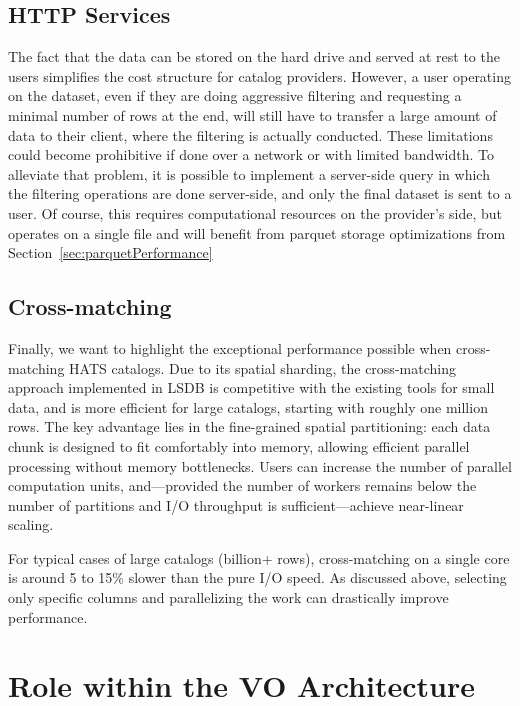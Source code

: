 \documentclass[11pt,a4paper]{ivoa}
\begin{document}
\subsection{HTTP Services}
The fact that the data can be stored on the hard drive and served at rest to the users simplifies the cost structure for catalog providers. 
However, a user operating on the dataset, even if they are doing aggressive filtering and requesting a minimal number of rows at the end, will still have to transfer a large amount of data to their client, where the filtering is actually conducted. 
These limitations could become prohibitive if done over a network or with limited bandwidth. 
To alleviate that problem, it is possible to implement a server-side query in which the filtering operations are done server-side, and only the final dataset is sent to a user. 
Of course, this requires computational resources on the provider's side, but operates on a single file and will benefit from parquet storage optimizations from Section~\ref{sec:parquetPerformance}

\subsection{Cross-matching}
Finally, we want to highlight the exceptional performance possible when cross-matching HATS catalogs. 
Due to its spatial sharding, the cross-matching approach implemented in LSDB is competitive with the existing tools for small data, and is more efficient for large catalogs, starting with roughly one million rows. 
The key advantage lies in the fine-grained spatial partitioning: each data chunk is designed to fit comfortably into memory, allowing efficient parallel processing without memory bottlenecks. Users can increase the number of parallel computation units, and—provided the number of workers remains below the number of partitions and I/O throughput is sufficient—achieve near-linear scaling. \par 

For typical cases of large catalogs (billion+ rows), cross-matching on a single core is around 5 to 15\% slower than the pure I/O speed. 
As discussed above, selecting only specific columns and parallelizing the work can drastically improve performance.   

\section{Role within the VO Architecture}
\end{document}

